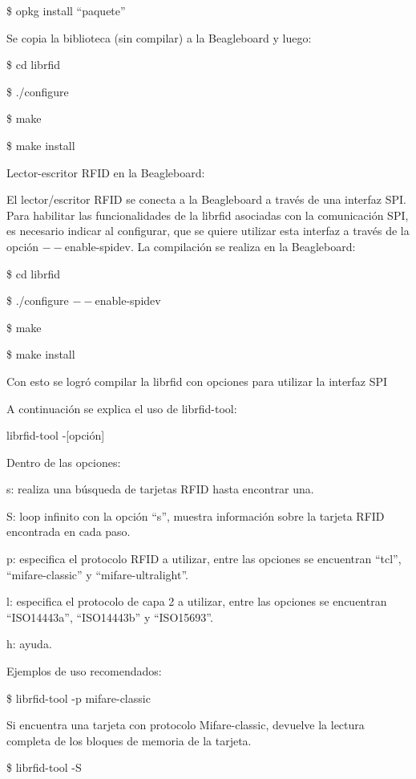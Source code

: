 \bigskip
\centerline{\$ opkg install “paquete”}
 
\bigskip
Se copia la biblioteca (sin compilar) a la Beagleboard y luego:

\bigskip
\centerline{\$ cd librfid}

\centerline{\$ ./configure}

\centerline{\$ make}

\centerline{\$ make install}


\bigskip
Lector-escritor RFID en la Beagleboard:

\bigskip
El lector/escritor RFID se conecta a la Beagleboard a través de una interfaz SPI.
Para habilitar las funcionalidades de la librfid asociadas con la comunicación SPI, es necesario indicar al configurar, que se quiere utilizar esta interfaz a través de la opción $--$enable-spidev. La compilación se realiza en la Beagleboard:

\bigskip
\centerline{\$ cd librfid}

\centerline{\$ ./configure $--$enable-spidev}

\centerline{\$ make}

\centerline{\$ make install}

\bigskip
Con esto se logró compilar la librfid con opciones para utilizar la interfaz SPI

\bigskip
A continuación se explica el uso de librfid-tool:

\bigskip
librfid-tool -[opción]

\bigskip
Dentro de las opciones:

s: realiza una búsqueda de tarjetas RFID hasta encontrar una.

S: loop infinito con la opción “s”, muestra información sobre la tarjeta RFID encontrada en cada paso.

p: especifica el protocolo RFID a utilizar, entre las opciones se encuentran “tcl”, “mifare-classic” y  “mifare-ultralight”.

l: especifica el protocolo de capa 2 a utilizar, entre las opciones se encuentran “ISO14443a”, “ISO14443b” y “ISO15693”.

h: ayuda.

\bigskip
Ejemplos de uso recomendados:

\bigskip
\centerline{\$ librfid-tool -p mifare-classic}

Si encuentra una tarjeta con protocolo Mifare-classic, devuelve la lectura completa de los bloques de memoria de la tarjeta.

\bigskip
\centerline{\$ librfid-tool -S}

